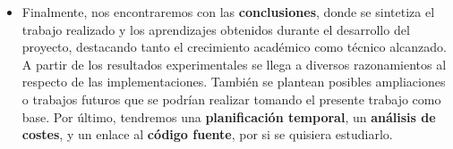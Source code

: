 \begin{itemize}
	\item Finalmente, nos encontraremos con las \textbf{conclusiones}, donde se sintetiza el trabajo realizado y los aprendizajes obtenidos durante el desarrollo del proyecto, destacando tanto el crecimiento académico como técnico alcanzado. A partir de los resultados experimentales se llega a diversos razonamientos al respecto de las implementaciones. También se plantean posibles ampliaciones o trabajos futuros que se podrían realizar tomando el presente trabajo como base. Por último, tendremos una \textbf{planificación temporal}, un \textbf{análisis de costes}, y un enlace al \textbf{código fuente}, por si se quisiera estudiarlo.
\end{itemize}


